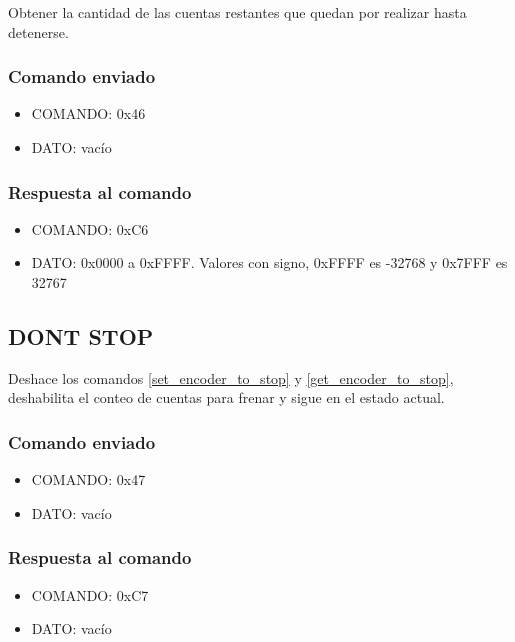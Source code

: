 \documentclass[a4paper,10pt]{article}
\begin{document}
Obtener la cantidad de las cuentas restantes que quedan por realizar hasta detenerse.

\subsubsection*{Comando enviado}

\begin{itemize}
	\item{COMANDO:} 0x46
	\item{DATO:} vac\'io
\end{itemize}

\subsubsection*{Respuesta al comando}

\begin{itemize}
	\item{COMANDO:} 0xC6
	\item{DATO:} 0x0000 a 0xFFFF. Valores con signo, 0xFFFF es -32768 y 0x7FFF es 32767
\end{itemize}

\subsection{DONT STOP}
\label{dont_stop}

Deshace los comandos \ref{set_encoder_to_stop} y \ref{get_encoder_to_stop}, deshabilita el conteo de cuentas para frenar y sigue en el estado actual.

\subsubsection*{Comando enviado}

\begin{itemize}
	\item{COMANDO:} 0x47
	\item{DATO:} vac\'io
\end{itemize}

\subsubsection*{Respuesta al comando}

\begin{itemize}
	\item{COMANDO:} 0xC7
	\item{DATO:} vac\'io
\end{itemize}
\end{document}
